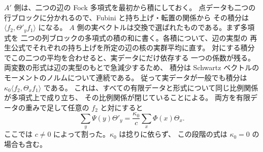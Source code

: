 \(A'\) 側は、二つの辺の Fock 多項式を最初から積にしておく。
点データも二つの行ブロックに分かれるので、Fubini と持ち上げ・転置の関係から
その積分は \(\langle f_2,\Theta'_y f_1\rangle\) になる。
\(A\) 側の実ベクトルは交換で選ばれたものである。まず多項式を
二つの列ブロックの多項式の積の和に書く。各積について、辺の実型の
再生公式でそれぞれの持ち上げを所定の辺の核の実群平均に直す。
対にする積分でこの二つの平均を合わせると、実データにだけ依存する
一つの係数が残る。両変数の形式は辺の実型のもとで急減少するため、
積分は Schwartz ベクトルのモーメントのノルムについて連続である。
従って実データが一般でも積分は \(\kappa_0\langle f_2,\Theta_x f_1\rangle\) である。
これは、すべての有限データと形式について同じ比例関係が多項式上で成り立ち、
その比例関係が閉じていることによる。
両方を有限データの重みで足して任意の \(f_2\) と対にすると
\begin{equation}\label{eq:exchange-square}
 \sum_y\Psi(y)\Theta'_y=\frac{\kappa_0}{c}\sum_x\Phi(x)\Theta_x .
\end{equation}
ここでは \(c\ne0\) によって割った。\(\kappa_0\) は捻りに依らず、
この段階の式は \(\kappa_0=0\) の場合も含む。
